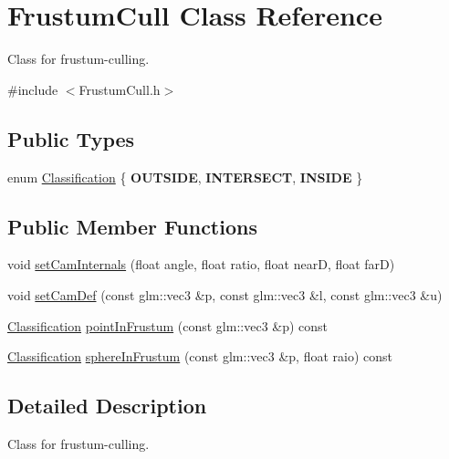\hypertarget{class_frustum_cull}{}\section{Frustum\+Cull Class Reference}
\label{class_frustum_cull}


Class for frustum-\/culling.  




{\ttfamily \#include $<$Frustum\+Cull.\+h$>$}

\subsection*{Public Types}
\begin{DoxyCompactItemize}
\item 
enum \mbox{\hyperlink{class_frustum_cull_ac3f2e416581ca09b43008ac4acabc508}{Classification}} \{ {\bfseries O\+U\+T\+S\+I\+DE}, 
{\bfseries I\+N\+T\+E\+R\+S\+E\+CT}, 
{\bfseries I\+N\+S\+I\+DE}
 \}
\end{DoxyCompactItemize}
\subsection*{Public Member Functions}
\begin{DoxyCompactItemize}
\item 
void \mbox{\hyperlink{class_frustum_cull_ae3f9818bf1c4c339875d9b28855ac39f}{set\+Cam\+Internals}} (float angle, float ratio, float nearD, float farD)
\item 
void \mbox{\hyperlink{class_frustum_cull_aab9e225ad60c090feed4824a3393c800}{set\+Cam\+Def}} (const glm\+::vec3 \&p, const glm\+::vec3 \&l, const glm\+::vec3 \&u)
\item 
\mbox{\hyperlink{class_frustum_cull_ac3f2e416581ca09b43008ac4acabc508}{Classification}} \mbox{\hyperlink{class_frustum_cull_a7f85e51b496174f49ecb9e4aaada2628}{point\+In\+Frustum}} (const glm\+::vec3 \&p) const
\item 
\mbox{\hyperlink{class_frustum_cull_ac3f2e416581ca09b43008ac4acabc508}{Classification}} \mbox{\hyperlink{class_frustum_cull_aaba1b14e06072c6e32d680f515e016ab}{sphere\+In\+Frustum}} (const glm\+::vec3 \&p, float raio) const
\end{DoxyCompactItemize}


\subsection{Detailed Description}
Class for frustum-\/culling. 



